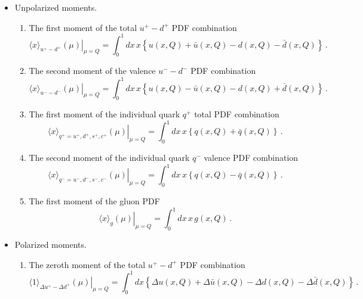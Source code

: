 \begin{itemize}

\item Unpolarized moments.

\begin{enumerate}

\item The first moment of the total $u^+-d^+$ PDF combination
\begin{equation}
\left.\langle x\rangle_{u^+-d^+}(\mu)\right|_{\mu=Q}
=
\int_0^1 dx\, x\left\{u(x,Q)+\bar{u}(x,Q)-d(x,Q)-\bar{d}(x,Q)\right\} \, .
\label{eq:unpfmumdtot}
\end{equation}

\item The second moment of the valence $u^--d^-$ PDF combination
\begin{equation}
\left.\langle x\rangle_{u^--d^-}(\mu)\right|_{\mu=Q}
=
\int_0^1 dx\, x\left\{u(x,Q)-\bar{u}(x,Q)-d(x,Q)+\bar{d}(x,Q)\right\} \, .
\label{eq:unpsmumdval}  
\end{equation}

\item The first moment of the individual quark $q^+$ total PDF combination
\begin{equation}
\left.\langle x\rangle_{q^+=u^+,d^+,s^+,c^+}(\mu)\right|_{\mu=Q}
=
\int_0^1 dx\, x\left\{q(x,Q)+\bar{q}(x,Q)\right\} \, .
\label{eq:unpfmiqtot}
\end{equation}

\item The second moment of the individual quark $q^-$ valence PDF combination
\begin{equation}
\left.\langle x\rangle_{q^-=u^-,d^-,s^-,c^-}(\mu)\right|_{\mu=Q}
=
\int_0^1 dx\, x\left\{q(x,Q)-\bar{q}(x,Q)\right\} \, .
\label{eq:unpsmiqval}
\end{equation}

\item The first moment of the gluon PDF
\begin{equation}
\left.\langle x \rangle_g(\mu)\right|_{\mu=Q}
=
\int_0^1 dx\, x\, g(x,Q) \, .
\label{eq:unpfmg}
\end{equation}

\end{enumerate}

\item Polarized moments.

\begin{enumerate}

\item The zeroth moment of the total $u^+-d^+$ PDF combination
\begin{equation}
\left.\langle 1 \rangle_{\Delta u^+-\Delta d^+}(\mu)\right|_{\mu=Q}
=
\int_0^1 dx \left\{\Delta u(x,Q)+\Delta\bar{u}(x,Q)
-\Delta d(x,Q)-\Delta\bar{d}(x,Q)\right\} \, .
\label{eq:polzmumdtot}
\end{equation}


\end{enumerate}
\end{itemize}
